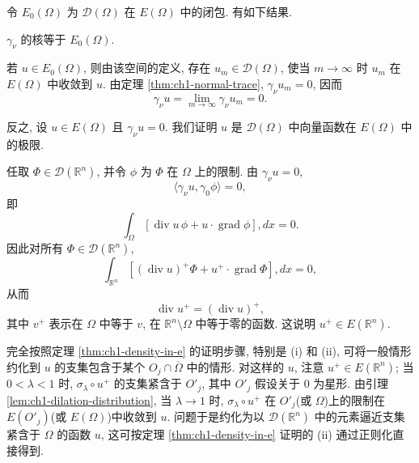 令 $E_0(\Omega)$ 为 $\mathbf{\mathcal D}(\Omega)$ 在 $E(\Omega)$ 中的闭包. 有如下结果.

\begin{Theorem}
\label{thm:ch1-kernel-normal-trace}
$\gamma_\nu$ 的核等于 $E_0(\Omega)$.
\end{Theorem}

\begin{Proof}
若 $u\in E_0(\Omega)$, 则由该空间的定义, 存在 $u_m\in\mathbf{\mathcal D}(\Omega)$, 使当 $m\to\infty$ 时 $u_m$ 在 $E(\Omega)$ 中收敛到 $u$. 由定理 \ref{thm:ch1-normal-trace}, $\gamma_\nu u_m=0$, 因而
\[
\gamma_\nu u=\lim_{m\to\infty}\gamma_\nu u_m=0.
\]

反之, 设 $u\in E(\Omega)$ 且 $\gamma_\nu u=0$. 我们证明 $u$ 是 $\mathbf{\mathcal D}(\Omega)$ 中向量函数在 $E(\Omega)$ 中的极限.

任取 $\Phi\in\mathcal D(\mathbb R^n)$, 并令 $\phi$ 为 $\Phi$ 在 $\Omega$ 上的限制. 由 $\gamma_\nu u=0$,
\[
\langle\gamma_\nu u,\gamma_0\phi\rangle=0,
\]
即
\[
\int_\Omega[\operatorname{div}u\,\phi+u\cdot\operatorname{grad}\phi],dx=0.
\]
因此对所有 $\Phi\in\mathcal D(\mathbb R^n)$,
\[
\int_{\mathbb R^n}[(\operatorname{div}u)^+\Phi+u^+\cdot\operatorname{grad}\Phi],dx=0,
\]
从而
\begin{equation}
\operatorname{div}u^+=(\operatorname{div}u)^+,
\label{eq:ch1-zero-extension-divergence}
\end{equation}
其中 $v^+$ 表示在 $\Omega$ 中等于 $v$, 在 $\mathbb R^n\setminus\Omega$ 中等于零的函数. 这说明 $u^+\in E(\mathbb R^n)$.

完全按照定理 \ref{thm:ch1-density-in-e} 的证明步骤, 特别是 (i) 和 (ii), 可将一般情形约化到 $u$ 的支集包含于某个 $O_j\cap\overline\Omega$ 中的情形. 对这样的 $u$, 注意 $u^+\in E(\mathbb R^n)$; 当 $0<\lambda<1$ 时, $\sigma_\lambda\circ u^+$ 的支集紧含于 $O'_j$, 其中 $O'_j$ 假设关于 $0$ 为星形. 由引理 \ref{lem:ch1-dilation-distribution}, 当 $\lambda\to1$ 时, $\sigma_\lambda\circ u^+$ 在 $O'_j$(或 $\Omega$)上的限制在 $E(O'_j)$(或 $E(\Omega)$)中收敛到 $u$. 问题于是约化为以 $\mathcal D(\mathbb R^n)$ 中的元素逼近支集紧含于 $\Omega$ 的函数 $u$, 这可按定理 \ref{thm:ch1-density-in-e} 证明的 (ii) 通过正则化直接得到.
\end{Proof}

